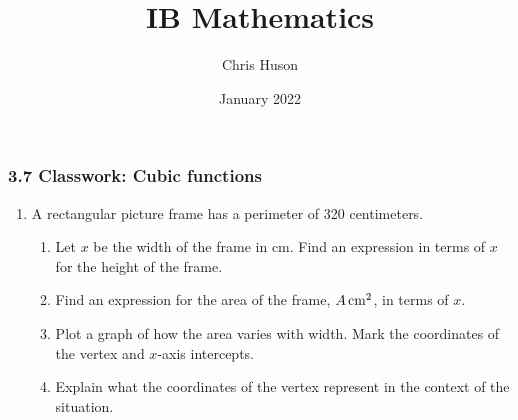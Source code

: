 \documentclass[12pt, twoside]{article}
\title{IB Mathematics}
\author{Chris Huson}
\date{January 2022}
\begin{document}
\subsubsection*{3.7 Classwork: Cubic functions}
\begin{enumerate}
\item A rectangular picture frame has a perimeter of 320 centimeters.
    \begin{enumerate}
        \item Let $x$ be the width of the frame in cm. Find an expression in terms of $x$ for the height of the frame. \vspace{2cm}
        \item Find an expression for the area of the frame, $A \,\rm{cm}^2$, in terms of $x$.  \vspace{2cm}
        \item Plot a graph of how the area varies with width. Mark the coordinates of the vertex and $x$-axis intercepts.
        \item Explain what the coordinates of the vertex represent in the context of the situation. \vspace{4cm}
    \end{enumerate}
    \begin{center}
    \end{center}
    

\end{enumerate}
\end{document}
